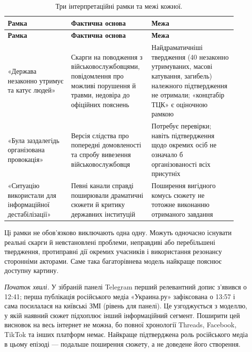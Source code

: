 \begin{longtable}{@{}>{\raggedright\arraybackslash}p{0.26\linewidth}>{\raggedright\arraybackslash}p{0.33\linewidth}>{\raggedright\arraybackslash}p{0.35\linewidth}@{}}
\caption{Три інтерпретаційні рамки та межі кожної.}\label{tab:frames}\\
\toprule\textbf{Рамка} & \textbf{Фактична основа} & \textbf{Межа}\\\midrule\endfirsthead
\toprule\textbf{Рамка} & \textbf{Фактична основа} & \textbf{Межа}\\\midrule\endhead
\bottomrule\endfoot
\footnotesize «Держава незаконно утримує та катує людей» & \footnotesize Скарги на поводження з військовослужбовцями, повідомлення про можливі порушення й травми, недовіра до офіційних пояснень & \footnotesize Найдраматичніші твердження (40 незаконно утримуваних, масові катування, загибель) належного підтвердження не отримали; «концтабір ТЦК» є оціночною рамкою\\
\footnotesize «Була заздалегідь організована провокація» & \footnotesize Версія слідства про попередні домовленості та спробу вивезення військовослужбовця & \footnotesize Потребує перевірки; навіть підтвердження щодо окремих осіб не означало б організованості всіх присутніх\\
\footnotesize «Ситуацію використали для інформаційної дестабілізації» & \footnotesize Певні канали справді поширювали драматичні сюжети й критику державних інституцій & \footnotesize Поширення вигідного комусь сюжету не тотожне виконанню отриманого завдання\\
\end{longtable}

Ці рамки не обов'язково виключають одна одну. Можуть одночасно існувати реальні скарги й невстановлені проблеми, неправдиві або перебільшені твердження, протиправні дії окремих учасників і використання резонансу сторонніми акторами. Саме така багаторівнева модель найкраще пояснює доступну картину.

\emph{Початок хвилі.} У зібраній панелі Telegram перший релевантний допис з'явився о 12:41; перша публікація російського медіа «Украина.ру» зафіксована о 13:57 і сама посилалася на київські ЗМІ (рівень  для панелі). Це узгоджується з моделлю, у якій наявний сюжет підхоплює інший інформаційний сегмент. Поширити цей висновок на весь інтернет не можна, бо повної хронології Threads, Facebook, TikTok та інших платформ немає. Найкраще підтверджена роль російського медіа в цьому епізоді --- подальше поширення сюжету, а не доведене його створення.

